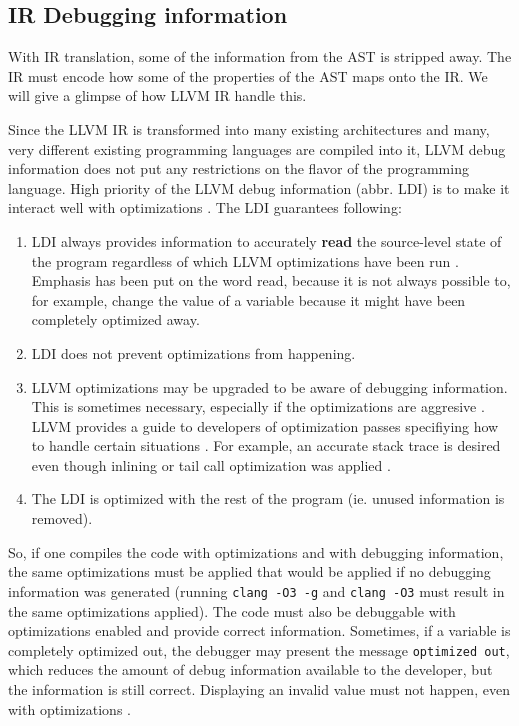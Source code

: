 \subsection{IR Debugging information}
With IR translation, some of the information from the AST is stripped away.
The IR must encode how some of the properties of the AST maps onto the IR.
We will give a glimpse of how LLVM IR handle this.

Since the LLVM IR is transformed into many existing architectures and many,
very different existing programming languages are compiled into it, LLVM debug
information does not put any restrictions on the flavor of the programming
language. High priority of the LLVM debug information (abbr. LDI) is to make it
interact well with optimizations \cite{llvm-debug-info}. The LDI guarantees
following:
\begin{enumerate}
    \item LDI always provides information to accurately \textbf{read} the
        source-level state of the program regardless of which LLVM
        optimizations have been run \cite{llvm-debug-info}. Emphasis has been
        put on the word read, because it is not always possible to, for
        example, change the value of a variable because it might have been
        completely optimized away.
    \item LDI does not prevent optimizations from happening.
    \item LLVM optimizations may be upgraded to be aware of debugging
        information. This is sometimes necessary, especially if the
        optimizations are aggresive \cite{llvm-debug-info}. LLVM provides a
        guide to developers of optimization passes specifiying how to handle
        certain situations \cite{llvm-debug-optimizations}. For example,
        an accurate stack trace is desired even though inlining or tail call
        optimization was applied \cite{llvm-debug-info}.
    \item The LDI is optimized with the rest of the program (ie. unused
        information is removed).
\end{enumerate}
So, if one compiles the code with optimizations and with debugging information,
the same optimizations must be applied that would be applied if no debugging
information was generated (running \texttt{clang -O3 -g} and \texttt{clang -O3}
must result in the same optimizations applied). The code must also be
debuggable with optimizations enabled and provide correct information.
Sometimes, if a variable is completely optimized out, the debugger may present
the message \texttt{optimized out}, which reduces the amount of debug
information available to the developer, but the information is still correct.
Displaying an invalid value must not happen, even with optimizations
\cite{llvm-debug-info}.

